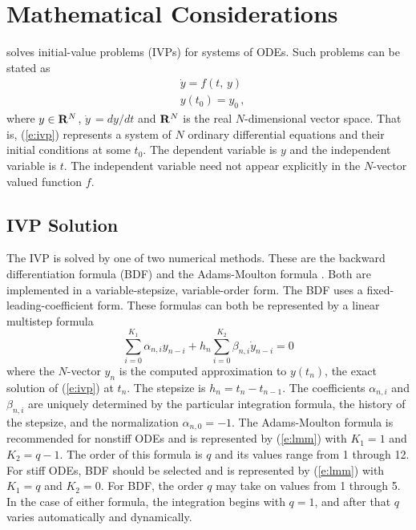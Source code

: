 \section{Mathematical Considerations}\label{s:math}

{\cvode} solves initial-value problems (IVPs) for systems of ODEs. 
Such problems can be stated as
\begin{equation}\label{e:ivp}
\begin{split}
&\dot{y} = f(t,\,y) \\
&y(t_0) = y_0 \, ,
\end{split}
\end{equation}
where $y \in {\bf R}^N$, $\dot{y}\,=dy/dt$ and ${\bf R}^N$ is the real $N$-dimensional
vector space. That is, (\ref{e:ivp}) represents a system of $N$ ordinary
differential equations and their initial conditions at some $t_0$. The
dependent variable is $y$ and the independent variable is $t$. The
independent variable need not appear explicitly in the $N$-vector valued
function $f$.

\subsection{IVP Solution}\label{ss:ivp_sol}

The IVP is solved by one of two numerical methods. These are the
backward differentiation formula (BDF)  and the 
Adams-Moulton formula . 
Both are implemented in a variable-stepsize, variable-order form. The BDF
uses a fixed-leading-coefficient form. These formulas can both be
represented by a linear multistep formula 
\begin{equation}\label{e:lmm}
\sum_{i=0}^{K_1}\alpha_{n,i}y_{n-i} + h_n\sum_{i=0}^{K_2}\beta_{n,i} 
\dot{y}_{n-i}=0
\end{equation}
where the $N$-vector $y_n$ is the computed approximation to $y(t_n)$,
the exact solution of (\ref{e:ivp}) at $t_n$. The stepsize is
$h_n=t_n-t_{n-1}$.  The coefficients $\alpha_{n,i}$ and $\beta_{n,i}$
are uniquely determined by the particular integration formula, the
history of the stepsize, and the normalization $\alpha_{n,0}=-1$. The
Adams-Moulton  formula is recommended for nonstiff ODEs and is
represented by (\ref{e:lmm}) with $K_1=1$ and $K_2=q-1$. The order
of this formula is $q$ and its values range from 1 through 12. For
stiff ODEs, BDF  should be selected and is represented by 
(\ref{e:lmm}) with $K_1=q$ and $K_2=0$. For BDF, the order $q$ may
take on values from 1 through 5. In the case of either formula, the
integration begins with $q=1$, and after that $q$ varies automatically
and dynamically.

